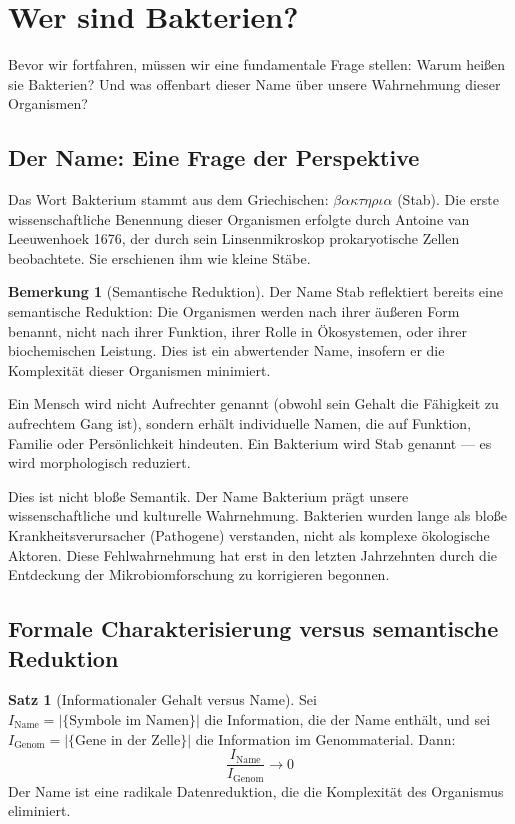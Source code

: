 \documentclass[a4paper,12pt]{article}
\theoremstyle{definition}
\newtheorem{satz}{Satz}
\newtheorem{bemerkung}{Bemerkung}
\begin{document}
\section{Wer sind Bakterien?}

Bevor wir fortfahren, müssen wir eine fundamentale Frage stellen: Warum heißen sie Bakterien? Und was offenbart dieser Name über unsere Wahrnehmung dieser Organismen?

\subsection{Der Name: Eine Frage der Perspektive}

Das Wort Bakterium stammt aus dem Griechischen: $\beta\alpha\kappa\tau\eta\rho\iota\alpha$ (Stab). Die erste wissenschaftliche Benennung dieser Organismen erfolgte durch Antoine van Leeuwenhoek 1676, der durch sein Linsenmikroskop prokaryotische Zellen beobachtete. Sie erschienen ihm wie kleine Stäbe.

\begin{bemerkung}[Semantische Reduktion]
Der Name Stab reflektiert bereits eine semantische Reduktion: Die Organismen werden nach ihrer äußeren Form benannt, nicht nach ihrer Funktion, ihrer Rolle in Ökosystemen, oder ihrer biochemischen Leistung. Dies ist ein abwertender Name, insofern er die Komplexität dieser Organismen minimiert.

Ein Mensch wird nicht Aufrechter genannt (obwohl sein Gehalt die Fähigkeit zu aufrechtem Gang ist), sondern erhält individuelle Namen, die auf Funktion, Familie oder Persönlichkeit hindeuten. Ein Bakterium wird Stab genannt --- es wird morphologisch reduziert.
\end{bemerkung}

Dies ist nicht bloße Semantik. Der Name Bakterium prägt unsere wissenschaftliche und kulturelle Wahrnehmung. Bakterien wurden lange als bloße Krankheitsverursacher (Pathogene) verstanden, nicht als komplexe ökologische Aktoren. Diese Fehlwahrnehmung hat erst in den letzten Jahrzehnten durch die Entdeckung der Mikrobiomforschung zu korrigieren begonnen.

\subsection{Formale Charakterisierung versus semantische Reduktion}

\begin{satz}[Informationaler Gehalt versus Name]
Sei $I_{\text{Name}} = |\{\text{Symbole im Namen}\}|$ die Information, die der Name enthält, und sei $I_{\text{Genom}} = |\{\text{Gene in der Zelle}\}|$ die Information im Genommaterial. Dann:
\[
\frac{I_{\text{Name}}}{I_{\text{Genom}}} \to 0
\]
Der Name ist eine radikale Datenreduktion, die die Komplexität des Organismus eliminiert.
\end{satz}
\end{document}
